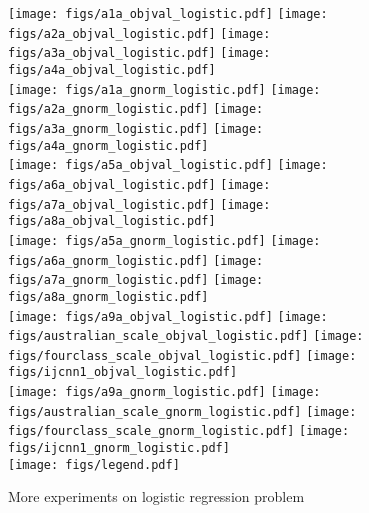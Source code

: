 \begin{figure}[!h]
\centering
\texttt{[image: figs/a1a\_objval\_logistic.pdf]}
\texttt{[image: figs/a2a\_objval\_logistic.pdf]}
\texttt{[image: figs/a3a\_objval\_logistic.pdf]}
\texttt{[image: figs/a4a\_objval\_logistic.pdf]}
\\
\texttt{[image: figs/a1a\_gnorm\_logistic.pdf]}
\texttt{[image: figs/a2a\_gnorm\_logistic.pdf]}
\texttt{[image: figs/a3a\_gnorm\_logistic.pdf]}
\texttt{[image: figs/a4a\_gnorm\_logistic.pdf]}
\\
\texttt{[image: figs/a5a\_objval\_logistic.pdf]}
\texttt{[image: figs/a6a\_objval\_logistic.pdf]}
\texttt{[image: figs/a7a\_objval\_logistic.pdf]}
\texttt{[image: figs/a8a\_objval\_logistic.pdf]}
\\
\texttt{[image: figs/a5a\_gnorm\_logistic.pdf]}
\texttt{[image: figs/a6a\_gnorm\_logistic.pdf]}
\texttt{[image: figs/a7a\_gnorm\_logistic.pdf]}
\texttt{[image: figs/a8a\_gnorm\_logistic.pdf]}
\\
\texttt{[image: figs/a9a\_objval\_logistic.pdf]}
\texttt{[image: figs/australian\_scale\_objval\_logistic.pdf]}
\texttt{[image: figs/fourclass\_scale\_objval\_logistic.pdf]}
\texttt{[image: figs/ijcnn1\_objval\_logistic.pdf]}
\\
\texttt{[image: figs/a9a\_gnorm\_logistic.pdf]}
\texttt{[image: figs/australian\_scale\_gnorm\_logistic.pdf]}
\texttt{[image: figs/fourclass\_scale\_gnorm\_logistic.pdf]}
\texttt{[image: figs/ijcnn1\_gnorm\_logistic.pdf]}
\\
\texttt{[image: figs/legend.pdf]}
\caption{More experiments on logistic regression problem}
\label{fig:log-add-1}
\end{figure}

